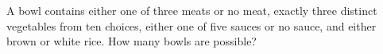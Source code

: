 A bowl contains either one of three meats or no meat, exactly three distinct vegetables from ten choices, either one of five sauces or no sauce, and either brown or white rice. How many bowls are possible?

